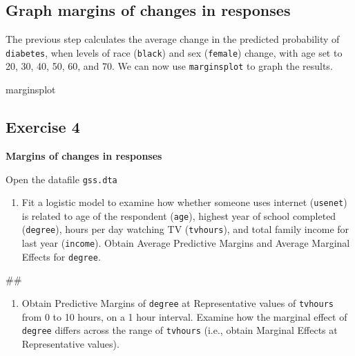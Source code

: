 \documentclass[
]{book}
\newenvironment{Shaded}{\begin{snugshade}}{\end{snugshade}}
\newcommand{\NormalTok}[1]{#1}
\providecommand{\tightlist}{%
  \setlength{\itemsep}{0pt}\setlength{\parskip}{0pt}}
\begin{document}
\hypertarget{graph-margins-of-changes-in-responses}{%
\subsection{Graph margins of changes in responses}\label{graph-margins-of-changes-in-responses}}

The previous step calculates the average change in the predicted probability of \texttt{diabetes}, when levels of race (\texttt{black}) and sex (\texttt{female}) change, with age set to 20, 30, 40, 50, 60, and 70. We can now use \texttt{marginsplot} to graph the results.

\begin{Shaded}
\begin{Highlighting}[]
\NormalTok{marginsplot}
\end{Highlighting}
\end{Shaded}

\hypertarget{exercise-4-2}{%
\subsection{Exercise 4}\label{exercise-4-2}}

\textbf{Margins of changes in responses}

Open the datafile \texttt{gss.dta}

\begin{enumerate}
\def\labelenumi{\arabic{enumi}.}
\tightlist
\item
  Fit a logistic model to examine how whether someone uses internet (\texttt{usenet}) is related to age of the respondent (\texttt{age}), highest year of school completed (\texttt{degree}), hours per day watching TV (\texttt{tvhours}), and total family income for last year (\texttt{income}). Obtain Average Predictive Margins and Average Marginal Effects for \texttt{degree}.
\end{enumerate}

\begin{Shaded}
\begin{Highlighting}[]
\NormalTok{\#\# }
\end{Highlighting}
\end{Shaded}

\begin{enumerate}
\def\labelenumi{\arabic{enumi}.}
\setcounter{enumi}{1}
\tightlist
\item
  Obtain Predictive Margins of \texttt{degree} at Representative values of \texttt{tvhours} from 0 to 10 hours, on a 1 hour interval. Examine how the marginal effect of \texttt{degree} differs across the range of \texttt{tvhours} (i.e., obtain Marginal Effects at Representative values).
\end{enumerate}
\end{document}
